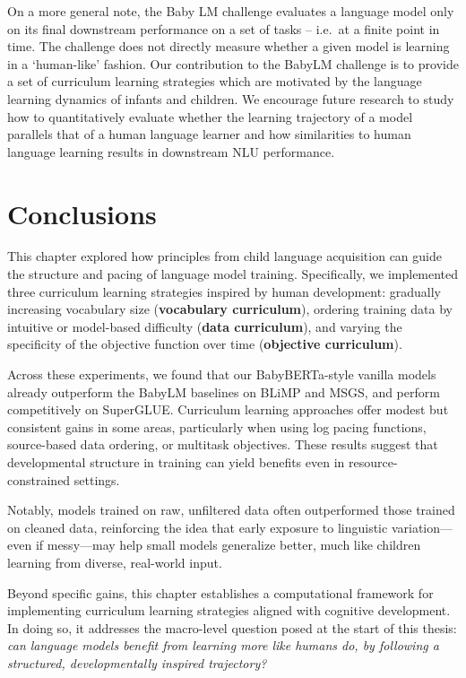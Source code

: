 On a more general note, the Baby LM challenge evaluates a language model only on its final downstream performance on a set of tasks -- i.e.\ at a finite point in time. The challenge does not directly measure whether a given model is learning in a `human-like' fashion. Our contribution to the BabyLM challenge is to provide a set of curriculum learning strategies which are motivated by the language learning dynamics of infants and children. We encourage future research to study how to quantitatively evaluate whether the learning trajectory of a model parallels that of a human language learner and how similarities to human language learning results in downstream NLU performance. 


\section{Conclusions}

This chapter explored how principles from child language acquisition can guide the structure and pacing of language model training. Specifically, we implemented three curriculum learning strategies inspired by human development: gradually increasing vocabulary size (\textbf{vocabulary curriculum}), ordering training data by intuitive or model-based difficulty (\textbf{data curriculum}), and varying the specificity of the objective function over time (\textbf{objective curriculum}).

Across these experiments, we found that our BabyBERTa-style vanilla models already outperform the BabyLM baselines on BLiMP and MSGS, and perform competitively on SuperGLUE. Curriculum learning approaches offer modest but consistent gains in some areas, particularly when using log pacing functions, source-based data ordering, or multitask objectives. These results suggest that developmental structure in training can yield benefits even in resource-constrained settings.

Notably, models trained on raw, unfiltered data often outperformed those trained on cleaned data, reinforcing the idea that early exposure to linguistic variation—even if messy—may help small models generalize better, much like children learning from diverse, real-world input.

Beyond specific gains, this chapter establishes a computational framework for implementing curriculum learning strategies aligned with cognitive development. In doing so, it addresses the macro-level question posed at the start of this thesis: \textit{can language models benefit from learning more like humans do, by following a structured, developmentally inspired trajectory?} 

